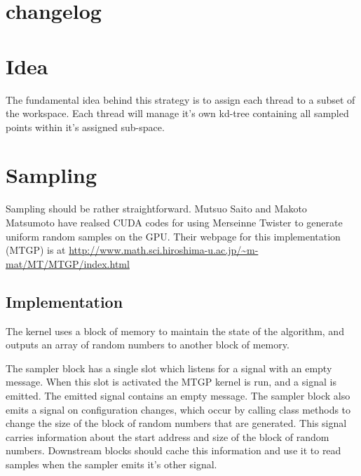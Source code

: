 
\maketitle

\section{changelog}



\section{Idea}

The fundamental idea behind this strategy is to assign each thread to a subset of the workspace. Each thread will manage it's own kd-tree containing all sampled points within it's assigned sub-space. 

\begin{figure}[H]
\begin{centering}
    \texttt{[image: \\figfile\{fig/thread\_kdtree]}}
    \caption{Division Strategy}
\end{centering}
\end{figure}

\section{Sampling}

Sampling should be rather straightforward. Mutsuo Saito and Makoto Matsumoto have realsed CUDA codes for using Merseinne Twister to generate uniform random samples on the GPU. Their webpage for this implementation (MTGP) is at \url{http://www.math.sci.hiroshima-u.ac.jp/~m-mat/MT/MTGP/index.html}

\subsection{Implementation}

The kernel uses a block of memory to maintain the state of the algorithm, and outputs an array of random numbers to another block of memory. 

\begin{figure}[H]
\begin{centering}
    \texttt{[image: \\figfile\{fig/blocks/sampler]}}
    \caption{Sampler Block}
\end{centering}
\end{figure}

The sampler block has a single slot which listens for a signal with an empty message. When this slot is activated the MTGP kernel is run, and a signal is emitted. The emitted signal contains an empty message. The sampler block also emits a signal on configuration changes, which occur by calling class methods to change the size of the block of random numbers that are generated. This signal carries information about the start address and size of the block of random numbers. Downstream blocks should cache this information and use it to read samples when the sampler emits it's other signal.


